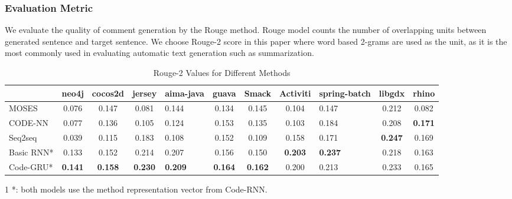 \subsubsection{Evaluation Metric}
We evaluate the quality of comment generation by the Rouge
method\cite{lin2004rouge}.
Rouge model counts the number of overlapping units between
generated sentence and target sentence.
We choose Rouge-2 score in this paper where word based 2-grams are used as
the unit, as it is the most commonly used in evaluating automatic text
generation such as summarization.







\begin{table}[th]
\caption{Rouge-2 Values for Different Methods}
\center
\scriptsize{
 \begin{tabular}{@{\ }p{}@{\ \ \ \ }c@{\ \ }c@{\ \ }c@{\ \ }p{}@{\ \ }c@{\ \ }c@{\ \ }c@{\ \ }p{}@{\ \ }c@{\ \ }c@{\ }}
 \hline
  & neo4j &cocos2d & jersey & aima-java & guava & Smack & Activiti & spring-batch & libgdx & rhino\\
 \hline
MOSES
& 0.076 & 0.147 & 0.081 & 0.144 & 0.134 & 0.145 & 0.104 & 0.147 & 0.212 & 0.082\\
\hline
CODE-NN
& 0.077 &{0.136} & 0.105 & 0.124 &0.153 & 0.135 & 0.103 & 0.184 & 0.208 & \textbf{0.171}\\
\hline
Seq2seq
& 0.039 & 0.115 & 0.183 & 0.108 & 0.152 & 0.109 & 0.158 &0.171  &  \textbf{0.247} & 0.169 \\ \hline
Basic RNN*
& 0.133 & 0.152 & 0.214 & {0.207} & 0.156 & 0.150 & \textbf{0.203} & \textbf{0.237} & 0.218 & 0.163\\
\hline
Code-GRU*
& \textbf{0.141} & \textbf{0.158} & \textbf{0.230} & \textbf{0.209} & \textbf{0.164} & \textbf{0.162} & 0.200 & 0.213 &  0.233 & 0.165\\
\hline
 \end{tabular}
 \begin{tablenotes}
  \item[1] *: both models use the method representation vector from Code-RNN.
\end{tablenotes}
}

\label{table:rouge}
\end{table}



